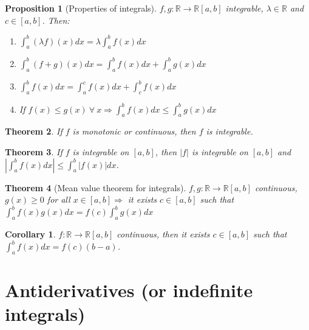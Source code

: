 \documentclass{article}
\newcommand{\abs}[1]{\left|#1\right|}
\newcommand{\Ar}{\Rightarrow}
\newenvironment{enumarabic}{\begin{enumerate}[label=(\arabic*)]}{\end{enumerate}}
\newcommand{\fOnR}[1]{#1 : \mathbb{R} \rightarrow \mathbb{R}}
\newcommand{\intcc}[1]{\left[#1\right]}
\theoremstyle{definition}
\theoremstyle{definition}
\theoremstyle{plain}
\newtheorem{theorem}{Theorem}[section]
\theoremstyle{plain}
\newtheorem{corollary}{Corollary}[theorem]
\theoremstyle{plain}
\theoremstyle{plain}
\newtheorem{proposition}[theorem]{Proposition}
\theoremstyle{definition}
\theoremstyle{remark}
\theoremstyle{remark}
\theoremstyle{remark}
\theoremstyle{remark}
\newcommand{\R}{\mathbb{R}}
\newcommand{\ForAll}{\ \forall \ }
\begin{document}
\begin{proposition}[Properties of integrals]
  $\fOnR{f,g}{\intcc{a,b}}$ integrable, $\lambda \in \R$ and $c \in \intcc{a,b}$. Then:
  \begin{enumarabic}
    \item $\int_a^b (\lambda f)(x) dx = \lambda \int_a^b f(x) dx$
    \item $\int_a^b (f+g)(x) dx = \int_a^b f(x) dx + \int_a^b g(x) dx$
    \item $\int_a^b f(x) dx = \int_a^c f(x) dx + \int_c^b f(x) dx$
    \item If $f(x) \leq g(x) \ForAll x \Ar \int_a^b f(x) dx \leq \int_a^b g(x) dx$
  \end{enumarabic}
\end{proposition}



\begin{theorem}
  If $f$ is monotonic or continuous, then $f$ is integrable.
\end{theorem}


\begin{theorem}
  If $f$ is integrable on $\intcc{a,b}$, then $|f|$ is integrable on $\intcc{a,b}$ and $\abs{\int_a^b f(x) dx} \leq \int_a^b |f(x)| dx$.
\end{theorem}



\begin{theorem}[Mean value theorem for integrals]
  $\fOnR{f,g}{\intcc{a,b}}$ continuous, $g(x) \geq 0$ for all $x \in \intcc{a,b} \Ar$ it exists $c \in \intcc{a,b}$ such that $\int_a^b f(x)g(x) dx = f(c) \int_a^b g(x) dx$
\end{theorem}


\begin{corollary}
  $\fOnR{f}{\intcc{a,b}}$ continuous, then it exists $c \in \intcc{a,b}$ such that $\int_a^b f(x) dx = f(c) (b-a)$.
\end{corollary}



\section{Antiderivatives (or indefinite integrals)}
\end{document}

